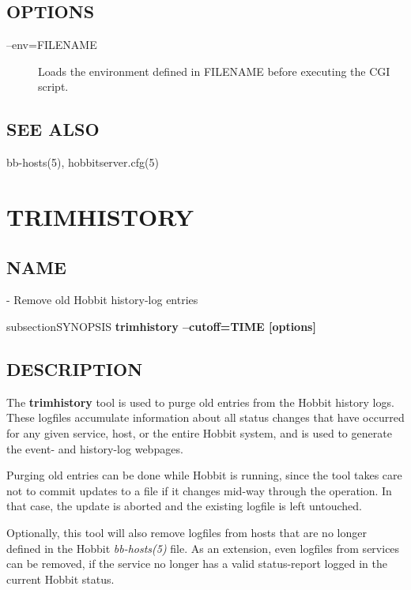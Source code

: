 
\subsection{OPTIONS}
\begin{description}
\item[--env=FILENAME] Loads the environment defined in FILENAME before executing the CGI script. 


\end{description}
\subsection{SEE ALSO}
bb-hosts(5), hobbitserver.cfg(5) 

 

%
\newpage
\section{TRIMHISTORY}
\subsection{NAME}
  - Remove old Hobbit history-log entries 

subsection{SYNOPSIS}
\textbf{trimhistory --cutoff=TIME [options]}


 
\subsection{DESCRIPTION}
 The \textbf{trimhistory}
 tool is used to purge old entries from the Hobbit history logs. These
 logfiles accumulate information about all status changes that have
 occurred for any given service, host, or the entire Hobbit system,
 and is used to generate the event- and history-log webpages. 


  Purging old entries can be done while Hobbit is running, since the
  tool takes care not to commit updates to a file if it changes
  mid-way through the operation. In that case, the update is aborted
  and the existing logfile is left untouched. 



  Optionally, this tool will also remove logfiles from hosts that are
  no longer defined in the Hobbit \emph{bb-hosts(5)} file. As an
  extension, even logfiles from services can be removed, if the
  service no longer has a valid status-report logged in the current
  Hobbit status. 



